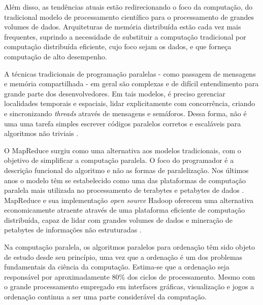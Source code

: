 Além disso, as tendências atuais estão redirecionando o foco da computação, do tradicional modelo de processamento científico para o processamento de grandes volumes de dados. Arquiteturas de memória distribuída estão cada vez mais frequentes, suprindo a necessidade de substituir a computação tradicional por computação distribuída eficiente, cujo foco sejam os dados, e que forneça computação de alto desempenho\cite{Bryant:2011}. 



A técnicas tradicionais de programação paralelas - como passagem de mensagens e memória compartilhada - em geral são complexas e de difícil entendimento para grande parte dos desenvolvedores. Em tais modelos, é preciso gerenciar localidades temporais e espaciais,  lidar explicitamente com concorrência, criando e sincronizando \textit{threads} através de mensagens e semáforos. Dessa forma, não é uma uma tarefa simples escrever códigos paralelos corretos e escaláveis para algoritmos não triviais \cite{Ranger:2007}.


O MapReduce surgiu como uma alternativa aos modelos tradicionais, com o objetivo de simplificar a computação paralela. 
O foco do programador é a descrição funcional do algoritmo e não as formas de paralelização. Nos últimos anos o modelo têm se estabelecido como uma das plataformas de computação paralela mais utilizada no processamento de terabytes e petabytes de dados \cite{Ranger:2007}.
MapReduce e sua implementação \textit{open source} Hadoop oferecem  uma alternativa economicamente atraente através de uma plataforma eficiente de computação distribuída, capaz de lidar com grandes volumes de dados e mineração de petabytes de informações não estruturadas \cite{Cherkasova:2011}.


Na computação paralela, os algoritmos paralelos para ordenação têm sido objeto de estudo desde seu princípio, uma vez que a  ordenação é um dos problemas fundamentais da ciência da computação. Estima-se que a ordenação seja responsável por aproximadamente 80\% dos ciclos de processamento. Mesmo com o grande processamento  empregado em interfaces gráficas, visualização e jogos a ordenação continua a ser uma parte considerável da computação.


